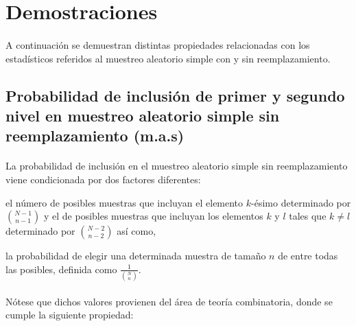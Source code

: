 \documentclass{article}
\begin{document}
	\maketitle
  \thispagestyle{empty}


  \section{Demostraciones}

    \paragraph{}
    A continuación se demuestran distintas propiedades relacionadas con los estadísticos referidos al muestreo aleatorio simple con y sin reemplazamiento.

    \subsection{Probabilidad de inclusión de primer y segundo nivel en muestreo aleatorio simple sin reemplazamiento (m.a.s)}

      \paragraph{}
      La probabilidad de inclusión en el muestreo aleatorio simple sin reemplazamiento viene condicionada por dos factores diferentes:

      \begin{enumerate*}[label=(\alph*)]
        \item el número de posibles muestras que incluyan el elemento $k$-ésimo determinado por $\binom{N-1}{n-1}$ y el de posibles muestras que incluyan los elementos $k$ y $l$ tales que $k \neq l$ determinado por $\binom{N-2}{n-2}$ así como,
        \item la probabilidad de elegir una determinada muestra de tamaño $n$ de entre todas las posibles, definida como $\frac{1}{\binom{N}{n}}$.
      \end{enumerate*}

      \paragraph{}
      Nótese que dichos valores provienen del área de teoría combinatoria, donde se cumple la siguiente propiedad: \cite{matematicaDiscreta2016notes}
\end{document}
